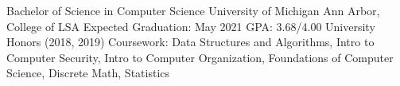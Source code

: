 

\begin{cventries}

  \cventry
    {Bachelor of Science in Computer Science} %
    {University of Michigan Ann Arbor, College of LSA} %
    {Expected Graduation: May 2021}
    {GPA: 3.68/4.00} %
    {
        University Honors (2018, 2019) \newline
        Coursework: Data Structures and Algorithms, Intro to Computer Security, Intro to Computer Organization, Foundations of Computer Science, Discrete Math, Statistics
    }
\end{cventries}
